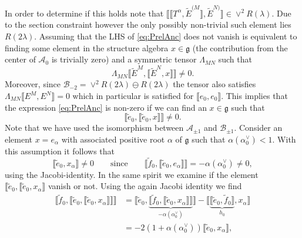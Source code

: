In order to determine if this holds note that $\llbracket\llbracket T^\alpha ,\tilde{E}^{(M}\rrbracket,\tilde{E}^{N)}\rrbracket\in \vee^2R(\lambda)$. Due to the section constraint however the only possibly non-trivial such element lies $R(2\lambda)$. Assuming that the LHS of \eqref{eq:PrelAnc} does not vanish is equivalent to finding some element in the structure algebra $x\in\mathfrak{g}$ (the contribution from the center of $\mathscr{A}_0$ is trivially zero) and a symmetric tensor $\Lambda_{MN}$ such that 
\begin{equation}
    \Lambda_{MN}\llbracket \tilde{E}^M,\llbracket\tilde{E}^N,x\rrbracket\rrbracket \neq 0.
\end{equation}
Moreover, since $\mathscr{B}_{-2}=\vee^2 R(2\lambda)\ominus R(2\lambda)$ the tensor also satisfies $\Lambda_{MN}\llbracket E^{M},E^N\rrbracket=0$ which in particular is satisfied for $\llbracket e_0,e_0\rrbracket$. This implies that the expression \eqref{eq:PrelAnc} is non-zero if we can find an $x\in\mathfrak{g}$ such that
\begin{equation}
    \llbracket \tilde{e}_0,\llbracket\tilde{e}_0,x\rrbracket\rrbracket \neq 0. 
\end{equation}
Note that we have used the isomorphism between $\mathscr{A}_{\pm 1}$ and $\mathscr{B}_{\pm 1}$. Consider an element $x=e_\alpha$ with associated positive root $\alpha$ of $\mathfrak{g}$ such that $\alpha(\alpha_0^\vee)< 1$. With this assumption it follows that 
\begin{equation}
    \llbracket \tilde{e}_0,x_\alpha\rrbracket \neq 0 \qquad \text{since}\qquad \llbracket \tilde{f}_0,\llbracket \tilde{e}_0,e_\alpha\rrbracket\rrbracket = -\alpha(\alpha_0^\vee)\neq 0, 
\end{equation}
using the Jacobi-identity. In the same spirit we examine if the element $\llbracket \tilde{e}_0,\llbracket \tilde{e}_0,x_\alpha\rrbracket$ vanish or not. Using the again Jacobi identity we find
\begin{equation}
    \begin{aligned}
        \llbracket \tilde{f}_0,\llbracket \tilde{e}_0,\llbracket \tilde{e}_0,x_\alpha\rrbracket\rrbracket\rrbracket  &= \llbracket \tilde{e}_0,\underbrace{\llbracket\tilde{f}_0,\llbracket \tilde{e}_0,x_\alpha\rrbracket\rrbracket}_{-\alpha(\alpha_0^\vee)}\rrbracket-\llbracket\underbrace{\llbracket \tilde{e}_0,\tilde{f}_0\rrbracket}_{h_0},x_\alpha\rrbracket\\
        &= -2(1+\alpha(\alpha_0^\vee))\llbracket \tilde{e}_0,x_\alpha\rrbracket,
    \end{aligned}
\end{equation}

